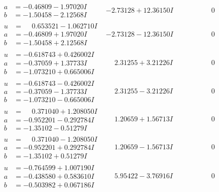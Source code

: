 \documentclass[1p]{elsarticle_modified}
\theoremstyle{definition}
\begin{document}
$$\begin{array}{c|c|c}
\begin{aligned}
a &= -0.46809 - 1.97020 I \\
b &= -1.50458 - 2.12568 I\end{aligned}
 & -2.73128 + 12.36150 I & \phantom{-0.000000 } 0 \\ \hline\begin{aligned}
u &= \phantom{-}0.653521 - 1.062710 I \\
a &= -0.46809 + 1.97020 I \\
b &= -1.50458 + 2.12568 I\end{aligned}
 & -2.73128 - 12.36150 I & \phantom{-0.000000 } 0 \\ \hline\begin{aligned}
u &= -0.618743 + 0.426002 I \\
a &= -0.37059 + 1.37733 I \\
b &= -1.073210 + 0.665006 I\end{aligned}
 & \phantom{-}2.31255 + 3.21226 I & \phantom{-0.000000 } 0 \\ \hline\begin{aligned}
u &= -0.618743 - 0.426002 I \\
a &= -0.37059 - 1.37733 I \\
b &= -1.073210 - 0.665006 I\end{aligned}
 & \phantom{-}2.31255 - 3.21226 I & \phantom{-0.000000 } 0 \\ \hline\begin{aligned}
u &= \phantom{-}0.371040 + 1.208050 I \\
a &= -0.952201 - 0.292784 I \\
b &= -1.35102 - 0.51279 I\end{aligned}
 & \phantom{-}1.20659 + 1.56713 I & \phantom{-0.000000 } 0 \\ \hline\begin{aligned}
u &= \phantom{-}0.371040 - 1.208050 I \\
a &= -0.952201 + 0.292784 I \\
b &= -1.35102 + 0.51279 I\end{aligned}
 & \phantom{-}1.20659 - 1.56713 I & \phantom{-0.000000 } 0 \\ \hline\begin{aligned}
u &= -0.764599 + 1.007190 I \\
a &= -0.438580 + 0.583610 I \\
b &= -0.503982 + 0.067186 I\end{aligned}
 & \phantom{-}5.95422 - 3.76916 I & \phantom{-0.000000 } 0 \\ \hline\begin{aligned}

\end{aligned}
\end{array}$$
\end{document}
